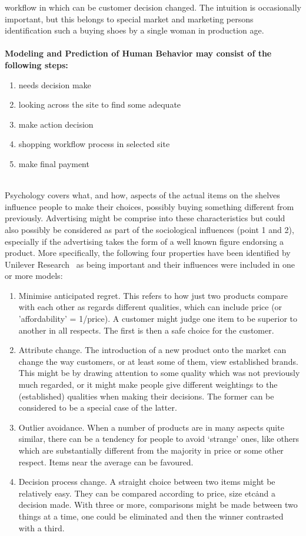workflow in which can be customer decision changed.
The intuition is occasionally important, but this belongs to special market and marketing persons identification such
a buying shoes by a single woman in production age.\\
\\
\textbf{Modeling and Prediction of Human Behavior may consist of the following steps:}\\
\begin{enumerate}
	\item needs decision make
	\item looking across the site to find some adequate
	\item make action decision
	\item shopping workflow process in selected site
	\item make final payment
\end{enumerate}
\\
Psychology covers what, and how, aspects of the actual items on the shelves influence people to make their choices,
possibly buying something different from previously.
Advertising might be comprise into these characteristics but could also possibly be considered as part of the sociological
influences (point 1 and 2), especially if the advertising takes the form of a well known figure endorsing a product.
More specifically, the following four properties have been identified by Unilever Research~\cite{patel} as being important
and their influences were included in one or more models:

\begin{enumerate}
	\item Minimise anticipated regret.
	This refers to how just two products compare with each other as regards different qualities, which can include
	price (or 'affordability' = 1/price).
	A customer might judge one item to be superior to another in all respects.
	The first is then a safe choice for the customer.
	\item Attribute change.
	The introduction of a new product onto the market can change the way customers, or at least some of them, view established brands.
	This might be by drawing attention to some quality which was not previously much regarded, or it might make people give different
	weightings to the (established) qualities when making their decisions.
	The former can be considered to be a special case of the latter.
	\item Outlier avoidance.
	When a number of products are in many aspects quite similar, there can be a tendency for people to avoid ‘strange’ ones, like others which
	are substantially different from the majority in price or some other respect.
	Items near the average can be favoured.
	\item Decision process change.
	A straight choice between two items might be relatively easy.
	They can be compared according to price, size etc\. and a decision made.
	With three or more, comparisons might be made between two things at a time, one could be eliminated and then the winner contrasted
	with a third.
\end{enumerate}
